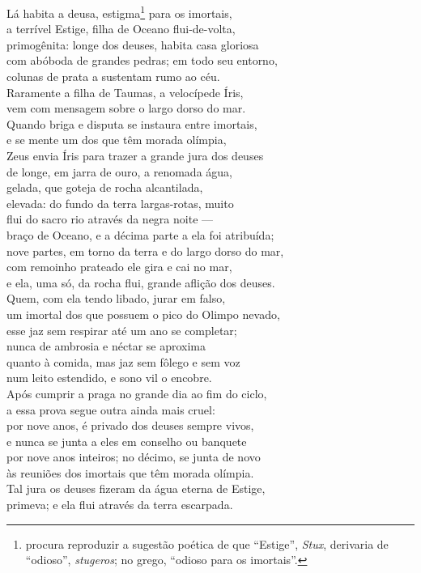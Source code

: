\quad{}Lá habita a deusa, estigma\footnote{procura reproduzir a sugestão poética de que ``Estige'', \emph{Stux}, derivaria de ``odioso'', \emph{stugeros}; no
grego, ``odioso para os imortais''.} para os imortais, \\
a terrível Estige, filha de Oceano flui-de-volta,\\
primogênita: longe dos deuses, habita casa gloriosa\\
com abóboda de grandes pedras; em todo seu entorno,\\
colunas de prata a sustentam rumo ao céu.\\
Raramente a filha de Taumas, a velocípede Íris, \\
vem com mensagem sobre o largo dorso do mar.\\
Quando briga e disputa se instaura entre imortais,\\
e se mente um dos que têm morada olímpia,\\
Zeus envia Íris para trazer a grande jura dos deuses\\
de longe, em jarra de ouro, a renomada água, \\
gelada, que goteja de rocha alcantilada,\\
elevada: do fundo da terra largas-rotas, muito\\
flui do sacro rio através da negra noite ---\\
braço de Oceano, e a décima parte a ela foi atribuída;\\
nove partes, em torno da terra e do largo dorso do mar, \\
com remoinho prateado ele gira e cai no mar,\\
e ela, uma só, da rocha flui, grande aflição dos deuses.\\
Quem, com ela tendo libado, jurar em falso,\\
um imortal dos que possuem o pico do Olimpo nevado,\\
esse jaz sem respirar até um ano se completar; \\
nunca de ambrosia e néctar se aproxima\\
quanto à comida, mas jaz sem fôlego e sem voz\\
num leito estendido, e sono vil o encobre.\\
Após cumprir a praga no grande dia ao fim do ciclo,\\
a essa prova segue outra ainda mais cruel: \\
por nove anos, é privado dos deuses sempre vivos,\\
e nunca se junta a eles em conselho ou banquete\\
por nove anos inteiros; no décimo, se junta de novo\\
às reuniões dos imortais que têm morada olímpia.\\
Tal jura os deuses fizeram da água eterna de Estige, \\
primeva; e ela flui através da terra escarpada.

